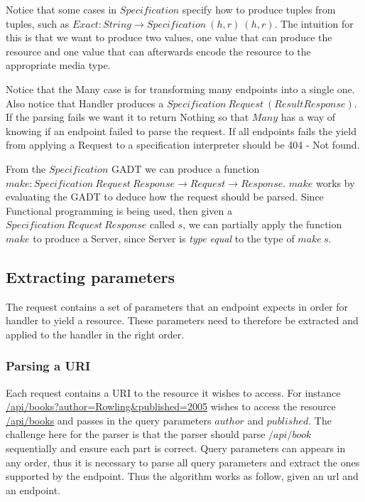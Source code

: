 Notice that some cases in $Specification$ specify how to produce tuples from
tuples, such as $Exact : String \rightarrow Specification\ (h,r)\ (h,r)$. The
intuition for this is that we want to produce two values, one value that can
produce the resource and one value that can afterwards encode the resource to
the appropriate media type.

Notice that the Many case is for transforming many endpoints into a single one.
Also notice that Handler produces a $Specification\ Request\ (Result Response)$.
If the parsing fails we want it to return Nothing so that $Many$ has a way of
knowing if an endpoint failed to parse the request. If all endpoints fails the
yield from applying a Request to a specification interpreter should be 404 - Not
found.

From the $Specification$ GADT we can produce a function $make : Specification\
Request\ Response \rightarrow Request \rightarrow Response$.  $make$ works by
evaluating the GADT to deduce how the request should be parsed.  Since
Functional programming is being used, then given a $Specification\ Request\
Response$ called $s$, we can partially apply the function $make$ to produce a
Server, since Server is \textit{type equal} to the type of $make\ s$.

\subsection{Extracting parameters}

The request contains a set of parameters that an endpoint expects in order for
handler to yield a resource. These parameters need to therefore be extracted and
applied to the handler in the right order. 

\subsubsection{Parsing a URI}

Each request contains a URI to the resource it wishes to access.  For instance
\url{/api/books?author=Rowling&published=2005} wishes to access the resource
\url{/api/books} and passes in the query parameters $author$ and $published$.
The challenge here for the parser is that the parser should parse $/api/book$
sequentially and ensure each part is correct. Query parameters can appears in
any order, thus it is necessary to parse all query parameters and extract the
ones supported by the endpoint. Thus the algorithm works as follow, given an url
and an endpoint.

